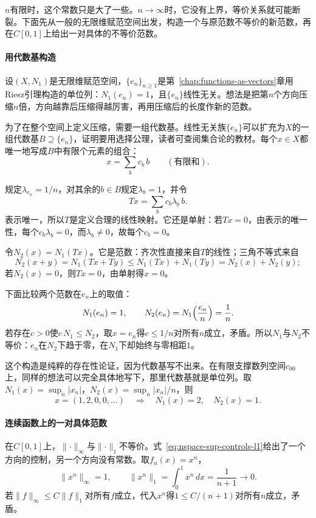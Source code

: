 $n$有限时，这个常数只是大了一些。$n\to\infty$时，它没有上界，等价关系就可能断裂。下面先从一般的无限维赋范空间出发，构造一个与原范数不等价的新范数，再在$C[0,1]$上给出一对具体的不等价范数。

\paragraph{用代数基构造}
设$(X,N_1)$是无限维赋范空间，$\{e_n\}_{n\geq1}$是第~\ref{chap:functions-as-vectors}章用Riesz引理构造的单位列：$N_1(e_n)=1$，且$\{e_n\}$线性无关。想法是把第$n$个方向压缩$n$倍，方向越靠后压缩得越厉害，再用压缩后的长度作新的范数。

为了在整个空间上定义压缩，需要一组代数基。线性无关族$\{e_n\}$可以扩充为$X$的一组代数基$B\supseteq\{e_n\}$，证明要用选择公理，读者可查阅集合论的教材。每个$x\in X$都唯一地写成$B$中有限个元素的组合：
\[
 x=\sum_{b}c_b\,b\qquad(\text{有限和}).
\]

规定$\lambda_{e_n}=1/n$，对其余的$b\in B$规定$\lambda_b=1$，并令
\[
 Tx=\sum_bc_b\lambda_b\,b.
\]
表示唯一，所以$T$是定义合理的线性映射。它还是单射：若$Tx=0$，由表示的唯一性，每个$c_b\lambda_b=0$，而$\lambda_b\neq0$，故每个$c_b=0$。

令$N_2(x)=N_1(Tx)$。它是范数：齐次性直接来自$T$的线性；三角不等式来自
\[
 N_2(x+y)=N_1(Tx+Ty)\leq N_1(Tx)+N_1(Ty)=N_2(x)+N_2(y);
\]
若$N_2(x)=0$，则$Tx=0$，由单射得$x=0$。

下面比较两个范数在$e_n$上的取值：
\[
 N_1(e_n)=1,\qquad N_2(e_n)=N_1\Bigl(\frac{e_n}{n}\Bigr)=\frac1n.
\]
若存在$c>0$使$c\,N_1\leq N_2$，取$x=e_n$得$c\leq1/n$对所有$n$成立，矛盾。所以$N_1$与$N_2$不等价：$e_n$在$N_2$下趋于零，在$N_1$下却始终与零相距$1$。

这个构造是纯粹的存在性论证，因为代数基写不出来。在有限支撑数列空间$c_{00}$上，同样的想法可以完全具体地写下，那里代数基就是单位列。取$N_1(x)=\sup_n\lvert x_n\rvert$，$N_2(x)=\sup_n\lvert x_n\rvert/n$，则
\[
 x=(1,2,0,0,\ldots)\quad\Longrightarrow\quad N_1(x)=2,\quad N_2(x)=1.
\]

\paragraph{连续函数上的一对具体范数}
在$C[0,1]$上，$\lVert\cdot\rVert_\infty$与$\lVert\cdot\rVert_1$不等价。式~\eqref{eq:nspace-sup-controls-l1}给出了一个方向的控制，另一个方向没有常数。取$f_n(x)=x^n$，
\[
 \lVert x^n\rVert_\infty=1,\qquad \lVert x^n\rVert_1=\int_0^1x^n\,dx=\frac1{n+1}\to0.
\]
若$\lVert f\rVert_\infty\leq C\lVert f\rVert_1$对所有$f$成立，代入$x^n$得$1\leq C/(n+1)$对所有$n$成立，矛盾。

